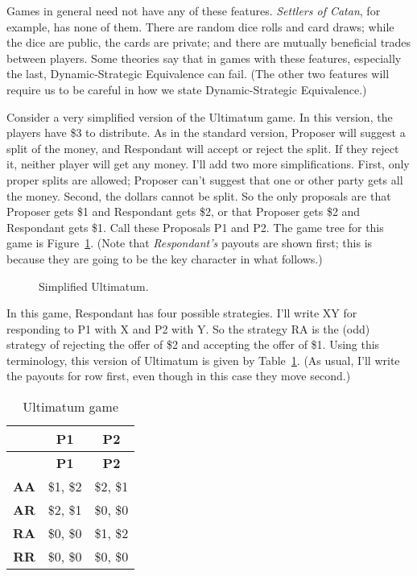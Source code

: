 \documentclass[
  10pt,
  letterpaper,
  DIV=11,
  numbers=noendperiod,
  twoside]{scrartcl}
\begin{document}
Games in general need not have any of these features. \emph{Settlers of
Catan}, for example, has none of them. There are random dice rolls and
card draws; while the dice are public, the cards are private; and there
are mutually beneficial trades between players. Some theories say that
in games with these features, especially the last, Dynamic-Strategic
Equivalence can fail. (The other two features will require us to be
careful in how we state Dynamic-Strategic Equivalence.)

Consider a very simplified version of the Ultimatum game. In this
version, the players have \$3 to distribute. As in the standard version,
Proposer will suggest a split of the money, and Respondant will accept
or reject the split. If they reject it, neither player will get any
money. I'll add two more simplifications. First, only proper splits are
allowed; Proposer can't suggest that one or other party gets all the
money. Second, the dollars cannot be split. So the only proposals are
that Proposer gets \$1 and Respondant gets \$2, or that Proposer gets
\$2 and Respondant gets \$1. Call these Proposals P1 and P2. The game
tree for this game is Figure~\ref{fig-ultimatum}. (Note that
\emph{Respondant's} payouts are shown first; this is because they are
going to be the key character in what follows.)

\begin{figure}


\caption{\label{fig-ultimatum}Simplified Ultimatum.}

\end{figure}%

In this game, Respondant has four possible strategies. I'll write XY for
responding to P1 with X and P2 with Y. So the strategy RA is the (odd)
strategy of rejecting the offer of \$2 and accepting the offer of \$1.
Using this terminology, this version of Ultimatum is given by
Table~\ref{tbl-ultimatum}. (As usual, I'll write the payouts for row
first, even though in this case they move second.)

\begin{longtable}[]{@{}rcc@{}}
\caption{Ultimatum game}\label{tbl-ultimatum}\tabularnewline
\toprule\noalign{}
& \textbf{P1} & \textbf{P2} \\
\midrule\noalign{}
\endfirsthead
\toprule\noalign{}
& \textbf{P1} & \textbf{P2} \\
\midrule\noalign{}
\endhead
\bottomrule\noalign{}
\endlastfoot
\textbf{AA} & \$1, \$2 & \$2, \$1 \\
\textbf{AR} & \$2, \$1 & \$0, \$0 \\
\textbf{RA} & \$0, \$0 & \$1, \$2 \\
\textbf{RR} & \$0, \$0 & \$0, \$0 \\
\end{longtable}
\end{document}
